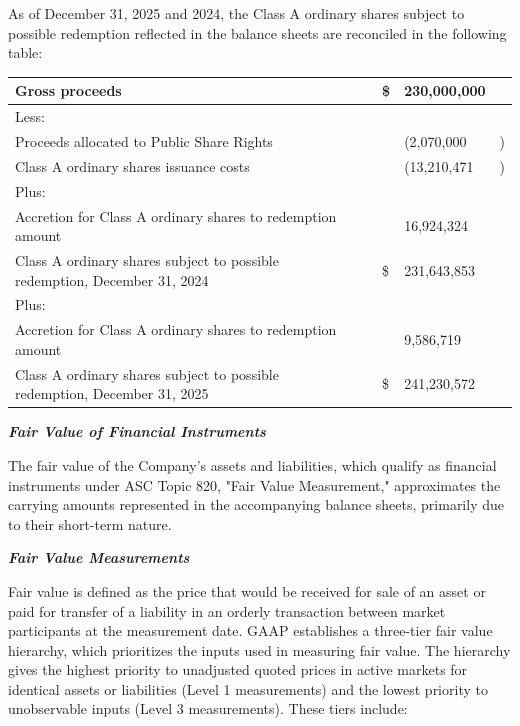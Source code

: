 \documentclass[11pt,a4paper]{article}
\begin{document}
As of December 31, 2025 and 2024, the Class A ordinary shares subject to possible redemption reflected in the balance sheets are reconciled in the following table:

\begin{table}[h]
\begin{tabular}{|l|l|l|l|l|}
\hline
Gross proceeds &  & \$ & 230,000,000 &  \\ \hline
Less: &  &  &  &  \\ \hline
Proceeds allocated to Public Share Rights &  &  & (2,070,000 & ) \\ \hline
Class A ordinary shares issuance costs &  &  & (13,210,471 & ) \\ \hline
Plus: &  &  &  &  \\ \hline
Accretion for Class A ordinary shares to redemption amount &  &  & 16,924,324 &  \\ \hline
Class A ordinary shares subject to possible redemption, December 31, 2024 &  & \$ & 231,643,853 &  \\ \hline
Plus: &  &  &  &  \\ \hline
Accretion for Class A ordinary shares to redemption amount &  &  & 9,586,719 &  \\ \hline
Class A ordinary shares subject to possible redemption, December 31, 2025 &  & \$ & 241,230,572 &  \\ \hline
\end{tabular}
\end{table}

\textit{\textbf{Fair Value of Financial Instruments}}

The fair value of the Company's assets and liabilities, which qualify as financial instruments under ASC Topic 820, "Fair Value Measurement," approximates the carrying amounts represented in the accompanying balance sheets, primarily due to their short-term nature.

\textit{\textbf{Fair Value Measurements}}

Fair value is defined as the price that would be received for sale of an asset or paid for transfer of a liability in an orderly transaction between market participants at the measurement date. GAAP establishes a three-tier fair value hierarchy, which prioritizes the inputs used in measuring fair value. The hierarchy gives the highest priority to unadjusted quoted prices in active markets for identical assets or liabilities (Level 1 measurements) and the lowest priority to unobservable inputs (Level 3 measurements). These tiers include:
\end{document}

